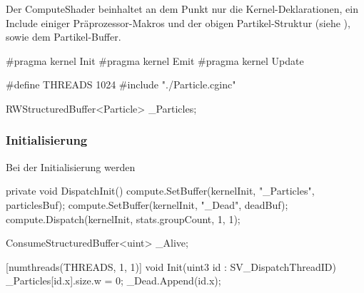 Der ComputeShader beinhaltet an dem Punkt nur die Kernel-Deklarationen, ein Include einiger Präprozessor-Makros und der obigen Partikel-Struktur (siehe ), sowie dem Partikel-Buffer. %

\begin{hlsl}
#pragma kernel Init
#pragma kernel Emit
#pragma kernel Update

#define THREADS 1024
#include "./Particle.cginc"

RWStructuredBuffer<Particle> _Particles;
\end{hlsl}

\subsubsection{Initialisierung}

Bei der Initialisierung werden

\begin{csh}
private void DispatchInit()
{
    compute.SetBuffer(kernelInit, "_Particles", particlesBuf);
    compute.SetBuffer(kernelInit, "_Dead", deadBuf);
    compute.Dispatch(kernelInit, stats.groupCount, 1, 1);
}
\end{csh}

\begin{hlsl}
ConsumeStructuredBuffer<uint> _Alive;

[numthreads(THREADS, 1, 1)]
void Init(uint3 id : SV_DispatchThreadID)
{
    _Particles[id.x].size.w = 0;
    _Dead.Append(id.x);
}
\end{hlsl}



